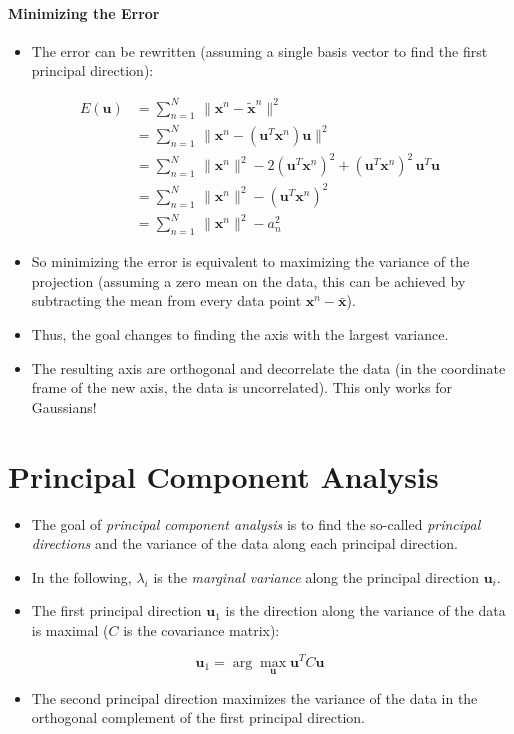 \documentclass[a4paper, 11pt, accentcolor = tud3b]{tudreport}
\renewcommand{\vec}[1]{\mathbf{#1}}
\begin{document}
			\paragraph{Minimizing the Error}
				\begin{itemize}
					\item The error can be rewritten (assuming a single basis vector to find the first principal direction):
				\end{itemize}
				\begin{align}
					E(\vec{u}) &= \sum_{n = 1}^{N} \, \lVert \vec{x}^n - \tilde{\vec{x}}^n \rVert^2 \\
						&= \sum_{n = 1}^{N} \, \lVert \vec{x}^n - (\vec{u}^T \vec{x}^n) \vec{u} \rVert^2 \\
						&= \sum_{n = 1}^{N} \, \lVert \vec{x}^n \rVert^2 - 2 (\vec{u}^T \vec{x}^n)^2 + (\vec{u}^T \vec{x}^n)^2 \, \vec{u}^T \vec{u} \\
						&= \sum_{n = 1}^{N} \, \lVert \vec{x}^n \rVert^2 - (\vec{u}^T \vec{x}^n)^2 \\
						&= \sum_{n = 1}^{N} \, \lVert \vec{x}^n \rVert^2 - a_n^2
				\end{align}
				\begin{itemize}
					\item So minimizing the error is equivalent to maximizing the variance of the projection (assuming a zero mean on the data, this can be achieved by subtracting the mean from every data point \( \vec{x}^n - \bar{\vec{x}} \)).
					\item Thus, the goal changes to finding the axis with the largest variance.
					\item The resulting axis are orthogonal and decorrelate the data (in the coordinate frame of the new axis, the data is uncorrelated). This only works for Gaussians!
				\end{itemize}

		\section{Principal Component Analysis}
			\begin{itemize}
				\item The goal of \emph{principal component analysis} is to find the so-called \emph{principal directions} and the variance of the data along each principal direction.
				\item In the following, \( \lambda_i \) is the \emph{marginal variance} along the principal direction \(\vec{u}_i\).
				\item The first principal direction \(\vec{u}_1\) is the direction along the variance of the data is maximal (\(C\) is the covariance matrix):
			\end{itemize}
			\begin{equation}
				\vec{u}_1 = \arg\max\limits_{\vec{u}} \vec{u}^T C \vec{u}
			\end{equation}
			\begin{itemize}
				\item The second principal direction maximizes the variance of the data in the orthogonal complement of the first principal direction.
			\end{itemize}
\end{document}
